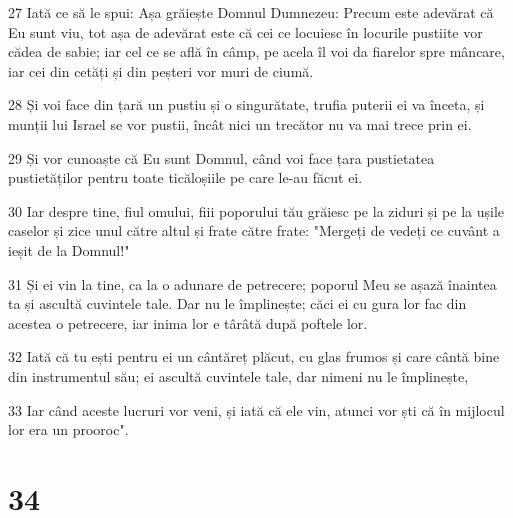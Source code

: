 \par 27 Iată ce să le spui: Așa grăiește Domnul Dumnezeu: Precum este adevărat că Eu sunt viu, tot așa de adevărat este că cei ce locuiesc în locurile pustiite vor cădea de sabie; iar cel ce se află în câmp, pe acela îl voi da fiarelor spre mâncare, iar cei din cetăți și din peșteri vor muri de ciumă.
\par 28 Și voi face din țară un pustiu și o singurătate, trufia puterii ei va înceta, și munții lui Israel se vor pustii, încât nici un trecător nu va mai trece prin ei.
\par 29 Și vor cunoaște că Eu sunt Domnul, când voi face țara pustietatea pustietăților pentru toate ticăloșiile pe care le-au făcut ei.
\par 30 Iar despre tine, fiul omului, fiii poporului tău grăiesc pe la ziduri și pe la ușile caselor și zice unul către altul și frate către frate: "Mergeți de vedeți ce cuvânt a ieșit de la Domnul!"
\par 31 Și ei vin la tine, ca la o adunare de petrecere; poporul Meu se așază înaintea ta și ascultă cuvintele tale. Dar nu le împlinește; căci ei cu gura lor fac din acestea o petrecere, iar inima lor e târâtă după poftele lor.
\par 32 Iată că tu ești pentru ei un cântăreț plăcut, cu glas frumos și care cântă bine din instrumentul său; ei ascultă cuvintele tale, dar nimeni nu le împlinește,
\par 33 Iar când aceste lucruri vor veni, și iată că ele vin, atunci vor ști că în mijlocul lor era un prooroc".

\chapter{34}

